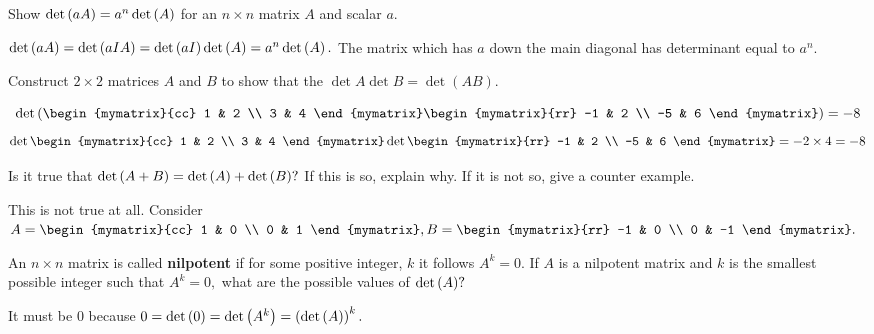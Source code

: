 \begin{enumialphparenastyle}
\begin{ex} Show $\det \left(aA\right) =a^{n}\det \left(A\right) $ for an $n \times n $ matrix $A
$ and scalar $a$. 
\begin{sol}
$\det \left(aA\right) =\det
\left(aIA\right) =\det \left(aI\right) \det \left(A\right) =a^{n}\det
\left(A\right) .$ The matrix which has $a$ down the main diagonal has
determinant equal to $a^{n}$.
\end{sol}
\end{ex}


\begin{ex} Construct $2\times 2$ matrices $A$ and $B$ to show that the
$\det A \det B = \det (AB)$. 
\begin{sol}
\[
\det
\tup{\begin{mymatrix}{cc}
1 & 2 \\
3 & 4
\end{mymatrix} \begin{mymatrix}{rr}
-1 & 2 \\
-5 & 6
\end{mymatrix} } = -8
\]
\[
\det \begin{mymatrix}{cc}
1 & 2 \\
3 & 4
\end{mymatrix} \det \begin{mymatrix}{rr}
-1 & 2 \\
-5 & 6
\end{mymatrix} = -2 \times 4 = -8
\]
\end{sol}
\end{ex}

\begin{ex} Is it true that $\det \left(A+B\right) =\det \left(A\right) +\det
\left(B\right) ?$ If this is so, explain why. If it is not so,
give a counter example.  
\begin{sol}
This is not true at all. Consider $A=\begin{mymatrix}{cc}
1 & 0 \\
0 & 1
\end{mymatrix} ,B=\begin{mymatrix}{rr}
-1 & 0 \\
0 & -1
\end{mymatrix} .$
\end{sol}
\end{ex}

\begin{ex} An $n\times n$ matrix is called \textbf{nilpotent}
 if for some positive integer, $k$ it follows $A^{k}=0.$ If
$A$ is a nilpotent matrix and $k$ is the smallest possible integer such that
$A^{k}=0,$ what are the possible values of $\det \left(A\right) ?$ 
\begin{sol}
It must
be 0 because $0=\det \left(0\right) =\det \left(A^{k}\right) =\left(\det
\left(A\right) \right) ^{k}.$
\end{sol}
\end{ex}


\end{enumialphparenastyle}
